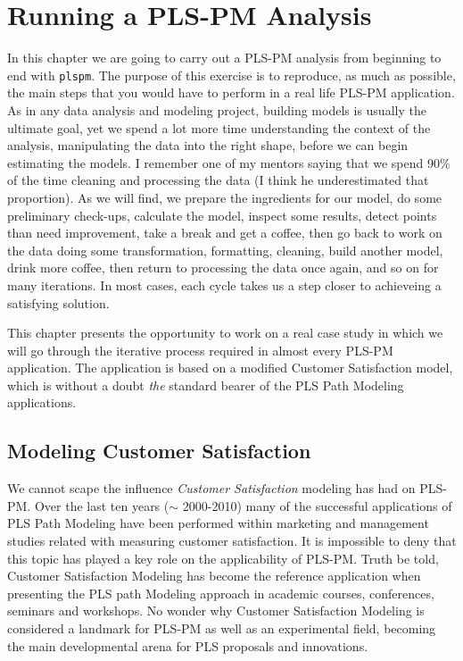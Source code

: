 \documentclass[12pt]{book}\usepackage{graphicx, color}
\newcommand{\plspm}{\texttt{plspm}}
\begin{document}



\chapter{Running a PLS-PM Analysis}
In this chapter we are going to carry out a PLS-PM analysis from beginning to end with \plspm{}. The purpose of this exercise is to reproduce, as much as possible, the main steps that you would have to perform in a real life PLS-PM application. As in any data analysis and modeling project, building models is usually the ultimate goal, yet we spend a lot more time understanding the context of the analysis, manipulating the data into the right shape, before we can begin estimating the models. I remember one of my mentors saying that we spend 90\% of the time cleaning and processing the data (I think he underestimated that proportion). As we will find, we prepare the ingredients for our model, do some preliminary check-ups, calculate the model, inspect some results, detect points than need improvement, take a break and get a coffee, then go back to work on the data doing some transformation, formatting, cleaning, build another model, drink more coffee, then return to processing the data once again, and so on for many iterations. In most cases, each cycle takes us a step closer to achieveing a satisfying solution. 

This chapter presents the opportunity to work on a real case study in which we will go through the iterative process required in almost every PLS-PM application. The application is based on a modified Customer Satisfaction model, which is without a doubt \textit{the} standard bearer of the PLS Path Modeling applications. 




\section{Modeling Customer Satisfaction}
We cannot scape the influence \textit{Customer Satisfaction} modeling has had on PLS-PM. Over the last ten years ($\sim$ 2000-2010) many of the successful applications of PLS Path Modeling have been performed within marketing and management studies related with measuring customer satisfaction. It is impossible to deny that this topic has played a key role on the applicability of PLS-PM. Truth be told, Customer Satisfaction Modeling has become the reference application when presenting the PLS path Modeling approach in academic courses, conferences, seminars and workshops. No wonder why Customer Satisfaction Modeling is considered a landmark for PLS-PM as well as an experimental field, becoming the main developmental arena for PLS proposals and innovations.
\end{document}
